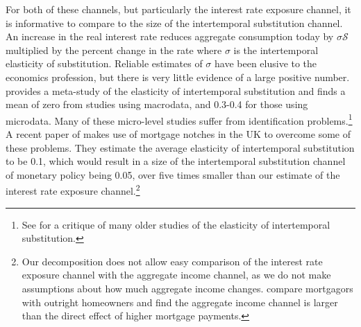 \documentclass[titlepage]{\econtex}\newcommand{\texname}{ConsumptionHeterogeneity}
\begin{document}
For both of these channels, but particularly the interest rate exposure channel, it is informative to compare to the size of the intertemporal substitution channel. An increase in the real interest rate reduces aggregate consumption today by $\sigma \mathcal{S}$ multiplied by the percent change in the rate where $\sigma$ is the intertemporal elasticity of substitution. Reliable estimates of $\sigma$ have been elusive to the economics profession, but there is very little evidence of a large positive number. \cite{havranek_measuring_2015} provides a meta-study of the elasticity of intertemporal substitution and finds a mean of zero from studies using macrodata, and 0.3-0.4 for those using microdata. Many of these micro-level studies suffer from identification problems.\footnote{See \cite{carroll_death_2001} for a critique of many older studies of the elasticity of intertemporal substitution.} A recent paper of \cite{best_estimating_2018} makes use of mortgage notches in the UK to overcome some of these problems. They estimate the average elasticity of intertemporal substitution to be 0.1, which would result in a size of the intertemporal substitution channel of monetary policy being 0.05, over five times smaller than our estimate of the interest rate exposure channel.\footnote{Our decomposition does not allow easy comparison of the interest rate exposure channel with the aggregate income channel, as we do not make assumptions about how much aggregate income changes. \cite{cloyne_monetary_2016} compare mortgagors with outright homeowners and find the aggregate income channel is larger than the direct effect of higher mortgage payments.}
\begin{center}
	\label{table:suff_stats}
	
\end{center}
\end{document}
